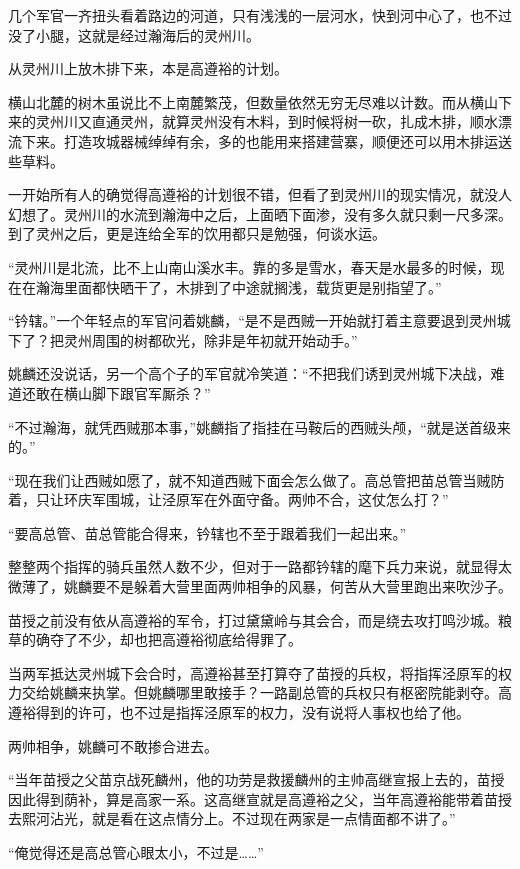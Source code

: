 几个军官一齐扭头看着路边的河道，只有浅浅的一层河水，快到河中心了，也不过没了小腿，这就是经过瀚海后的灵州川。

从灵州川上放木排下来，本是高遵裕的计划。

横山北麓的树木虽说比不上南麓繁茂，但数量依然无穷无尽难以计数。而从横山下来的灵州川又直通灵州，就算灵州没有木料，到时候将树一砍，扎成木排，顺水漂流下来。打造攻城器械绰绰有余，多的也能用来搭建营寨，顺便还可以用木排运送些草料。

一开始所有人的确觉得高遵裕的计划很不错，但看了到灵州川的现实情况，就没人幻想了。灵州川的水流到瀚海中之后，上面晒下面渗，没有多久就只剩一尺多深。到了灵州之后，更是连给全军的饮用都只是勉强，何谈水运。

“灵州川是北流，比不上山南山溪水丰。靠的多是雪水，春天是水最多的时候，现在在瀚海里面都快晒干了，木排到了中途就搁浅，载货更是别指望了。”

“钤辖。”一个年轻点的军官问着姚麟，“是不是西贼一开始就打着主意要退到灵州城下了？把灵州周围的树都砍光，除非是年初就开始动手。”

姚麟还没说话，另一个高个子的军官就冷笑道：“不把我们诱到灵州城下决战，难道还敢在横山脚下跟官军厮杀？”

“不过瀚海，就凭西贼那本事，”姚麟指了指挂在马鞍后的西贼头颅，“就是送首级来的。”

“现在我们让西贼如愿了，就不知道西贼下面会怎么做了。高总管把苗总管当贼防着，只让环庆军围城，让泾原军在外面守备。两帅不合，这仗怎么打？”

“要高总管、苗总管能合得来，钤辖也不至于跟着我们一起出来。”

整整两个指挥的骑兵虽然人数不少，但对于一路都钤辖的麾下兵力来说，就显得太微薄了，姚麟要不是躲着大营里面两帅相争的风暴，何苦从大营里跑出来吹沙子。

苗授之前没有依从高遵裕的军令，打过黛黛岭与其会合，而是绕去攻打鸣沙城。粮草的确夺了不少，却也把高遵裕彻底给得罪了。

当两军抵达灵州城下会合时，高遵裕甚至打算夺了苗授的兵权，将指挥泾原军的权力交给姚麟来执掌。但姚麟哪里敢接手？一路副总管的兵权只有枢密院能剥夺。高遵裕得到的许可，也不过是指挥泾原军的权力，没有说将人事权也给了他。

两帅相争，姚麟可不敢掺合进去。

“当年苗授之父苗京战死麟州，他的功劳是救援麟州的主帅高继宣报上去的，苗授因此得到荫补，算是高家一系。这高继宣就是高遵裕之父，当年高遵裕能带着苗授去熙河沾光，就是看在这点情分上。不过现在两家是一点情面都不讲了。”

“俺觉得还是高总管心眼太小，不过是……”

